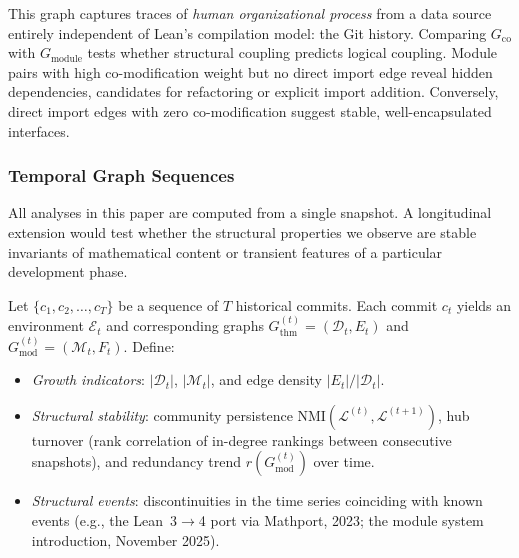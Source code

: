 This graph captures traces of \emph{human organizational process} from a data source entirely independent of Lean's compilation model: the Git history. Comparing $G_{\mathrm{co}}$ with $G_{\mathrm{module}}$ tests whether structural coupling predicts logical coupling. Module pairs with high co-modification weight but no direct import edge reveal hidden dependencies, candidates for refactoring or explicit import addition. Conversely, direct import edges with zero co-modification suggest stable, well-encapsulated interfaces.

\subsubsection{Temporal Graph Sequences}
\label{sec:temporal-graphs}

All analyses in this paper are computed from a single snapshot. A longitudinal extension would test whether the structural properties we observe are stable invariants of mathematical content or transient features of a particular development phase.

\begin{definition}\label{def:temporal-sequence}
Let $\{c_1, c_2, \ldots, c_T\}$ be a sequence of $T$ historical  commits. Each commit $c_t$ yields an environment $\mathcal{E}_t$ and corresponding graphs $G_{\mathrm{thm}}^{(t)} = (\mathcal{D}_t, E_t)$ and $G_{\mathrm{mod}}^{(t)} = (\mathcal{M}_t, F_t)$. Define:
\begin{itemize}
  \item \emph{Growth indicators}: $|\mathcal{D}_t|$, $|\mathcal{M}_t|$, and edge density $|E_t| / |\mathcal{D}_t|$.
  \item \emph{Structural stability}: community persistence $\mathrm{NMI}(\mathcal{L}^{(t)}, \mathcal{L}^{(t+1)})$, hub turnover (rank correlation of in-degree rankings between consecutive snapshots), and redundancy trend $r(G_{\mathrm{mod}}^{(t)})$ over time.
  \item \emph{Structural events}: discontinuities in the time series coinciding with known events (e.g., the Lean~3$\to$4 port via Mathport, 2023; the module system introduction, November 2025).
\end{itemize}
\end{definition}

